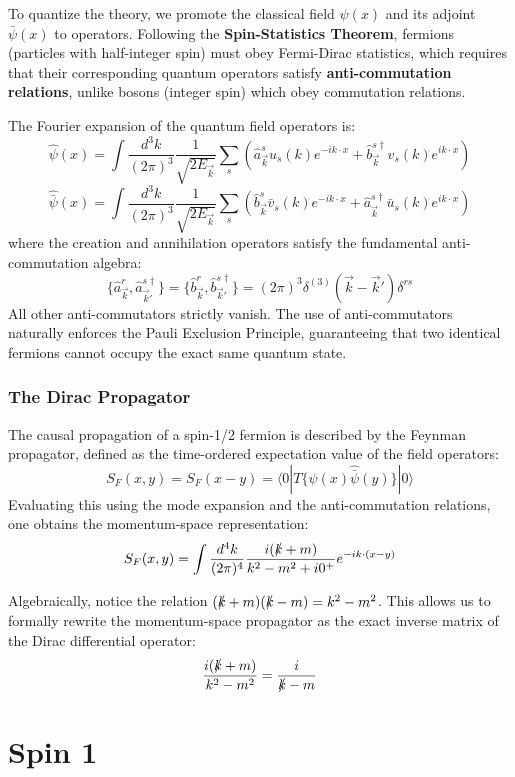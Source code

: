 To quantize the theory, we promote the classical field $\psi(x)$ and its adjoint $\bar{\psi}(x)$ to operators. Following the \textbf{Spin-Statistics Theorem}, fermions (particles with half-integer spin) must obey Fermi-Dirac statistics, which requires that their corresponding quantum operators satisfy \textbf{anti-commutation relations}, unlike bosons (integer spin) which obey commutation relations.

The Fourier expansion of the quantum field operators is:
\[
    \hat{\psi}(x) = \int \frac{d^3k}{(2\pi)^3} \frac{1}{\sqrt{2E_{\vec{k}}}} \sum_s \left( \hat{a}_{\vec{k}}^s u_s(k) e^{-ik \cdot x} + \hat{b}_{\vec{k}}^{s\dagger} v_s(k) e^{ik \cdot x} \right)
\]
\[
    \hat{\bar{\psi}}(x) = \int \frac{d^3k}{(2\pi)^3} \frac{1}{\sqrt{2E_{\vec{k}}}} \sum_s \left( \hat{b}_{\vec{k}}^s \bar{v}_s(k) e^{-ik \cdot x} + \hat{a}_{\vec{k}}^{s\dagger} \bar{u}_s(k) e^{ik \cdot x} \right)
\]
where the creation and annihilation operators satisfy the fundamental anti-commutation algebra:
\[
    \{ \hat{a}_{\vec{k}}^r, \hat{a}_{\vec{k}'}^{s\dagger} \} = \{ \hat{b}_{\vec{k}}^r, \hat{b}_{\vec{k}'}^{s\dagger} \} = (2\pi)^3 \delta^{(3)}(\vec{k} - \vec{k}') \delta^{rs}
\]
All other anti-commutators strictly vanish. The use of anti-commutators naturally enforces the Pauli Exclusion Principle, guaranteeing that two identical fermions cannot occupy the exact same quantum state.

\subsubsection{The Dirac Propagator}
The causal propagation of a spin-1/2 fermion is described by the Feynman propagator, defined as the time-ordered expectation value of the field operators:
\[
    S_F(x, y) = S_F(x - y) = \langle 0 | T \{ \hat{\psi}(x) \hat{\bar{\psi}}(y) \} | 0 \rangle
\]
Evaluating this using the mode expansion and the anti-commutation relations, one obtains the momentum-space representation:
\[
    S_F(x, y) = \int \frac{d^4k}{(2\pi)^4} \frac{i(\slashed{k} + m)}{k^2 - m^2 + i0^+} e^{-ik \cdot (x - y)}
\]
\begin{remark}
    Algebraically, notice the relation $(\slashed{k} + m)(\slashed{k} - m) = k^2 - m^2$. This allows us to formally rewrite the momentum-space propagator as the exact inverse matrix of the Dirac differential operator:
    \[
        \frac{i(\slashed{k} + m)}{k^2 - m^2} = \frac{i}{\slashed{k} - m}
    \]
\end{remark}

\section{Spin 1}

